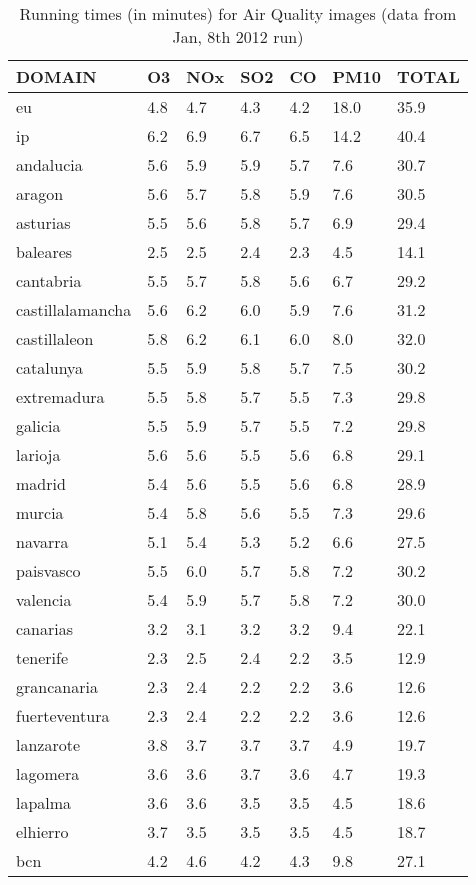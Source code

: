 \documentclass[11pt]{article}
\begin{document}
\begin{table}
\begin{center}
\begin{tabular}{lllllll}
DOMAIN & O3 & NOx & SO2 & CO & PM10 & TOTAL \\
\hline\hline
eu & 4.8 & 4.7 & 4.3 & 4.2 & 18.0 & 35.9\\
ip & 6.2 & 6.9 & 6.7 & 6.5 & 14.2 & 40.4\\
andalucia & 5.6 & 5.9 & 5.9 & 5.7 & 7.6 & 30.7\\
aragon & 5.6 & 5.7 & 5.8 & 5.9 & 7.6 & 30.5\\
asturias & 5.5 & 5.6 & 5.8 & 5.7 & 6.9 & 29.4\\
baleares & 2.5 & 2.5 & 2.4 & 2.3 & 4.5 & 14.1\\
cantabria & 5.5 & 5.7 & 5.8 & 5.6 & 6.7 & 29.2\\
castillalamancha & 5.6 & 6.2 & 6.0 & 5.9 & 7.6 & 31.2\\
castillaleon & 5.8 & 6.2 & 6.1 & 6.0 & 8.0 & 32.0\\
catalunya & 5.5 & 5.9 & 5.8 & 5.7 & 7.5 & 30.2\\
extremadura & 5.5 & 5.8 & 5.7 & 5.5 & 7.3 & 29.8\\
galicia & 5.5 & 5.9 & 5.7 & 5.5 & 7.2 & 29.8\\
larioja & 5.6 & 5.6 & 5.5 & 5.6 & 6.8 & 29.1\\
madrid & 5.4 & 5.6 & 5.5 & 5.6 & 6.8 & 28.9\\
murcia & 5.4 & 5.8 & 5.6 & 5.5 & 7.3 & 29.6\\
navarra & 5.1 & 5.4 & 5.3 & 5.2 & 6.6 & 27.5\\
paisvasco & 5.5 & 6.0 & 5.7 & 5.8 & 7.2 & 30.2\\
valencia & 5.4 & 5.9 & 5.7 & 5.8 & 7.2 & 30.0\\
canarias & 3.2 & 3.1 & 3.2 & 3.2 & 9.4 & 22.1\\
tenerife & 2.3 & 2.5 & 2.4 & 2.2 & 3.5 & 12.9\\
grancanaria & 2.3 & 2.4 & 2.2 & 2.2 & 3.6 & 12.6\\
fuerteventura & 2.3 & 2.4 & 2.2 & 2.2 & 3.6 & 12.6\\
lanzarote & 3.8 & 3.7 & 3.7 & 3.7 & 4.9 & 19.7\\
lagomera & 3.6 & 3.6 & 3.7 & 3.6 & 4.7 & 19.3\\
lapalma & 3.6 & 3.6 & 3.5 & 3.5 & 4.5 & 18.6\\
elhierro & 3.7 & 3.5 & 3.5 & 3.5 & 4.5 & 18.7\\
bcn & 4.2 & 4.6 & 4.2 & 4.3 & 9.8 & 27.1\\\end{tabular}
\end{center}
\label{t:times-aq}
\caption{Running times (in minutes) for Air Quality images (data from Jan, 8th 2012 run)}
\end{table}
\end{document}
